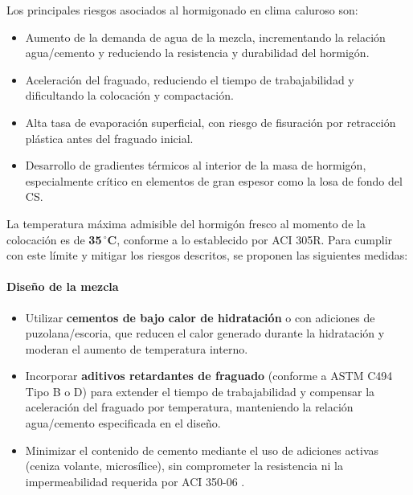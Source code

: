 Los principales riesgos asociados al hormigonado en clima caluroso son:

\begin{itemize}
    \item Aumento de la demanda de agua de la mezcla, incrementando la relación agua/cemento y reduciendo la resistencia y durabilidad del hormigón.
    \item Aceleración del fraguado, reduciendo el tiempo de trabajabilidad y dificultando la colocación y compactación.
    \item Alta tasa de evaporación superficial, con riesgo de fisuración por retracción plástica antes del fraguado inicial.
    \item Desarrollo de gradientes térmicos al interior de la masa de hormigón, especialmente crítico en elementos de gran espesor como la losa de fondo del CS.
\end{itemize}

\noindent La temperatura máxima admisible del hormigón fresco al momento de la colocación es de \textbf{35\,$^\circ$C}, conforme a lo establecido por ACI 305R. Para cumplir con este límite y mitigar los riesgos descritos, se proponen las siguientes medidas:

\paragraph{Diseño de la mezcla}
\begin{itemize}
    \item Utilizar \textbf{cementos de bajo calor de hidratación} o con adiciones de puzolana/escoria, que reducen el calor generado durante la hidratación y moderan el aumento de temperatura interno.
    \item Incorporar \textbf{aditivos retardantes de fraguado} (conforme a ASTM C494 Tipo B o D) para extender el tiempo de trabajabilidad y compensar la aceleración del fraguado por temperatura, manteniendo la relación agua/cemento especificada en el diseño.
    \item Minimizar el contenido de cemento mediante el uso de adiciones activas (ceniza volante, microsílice), sin comprometer la resistencia ni la impermeabilidad requerida por ACI 350-06 \cite{ACI350}.
\end{itemize}

